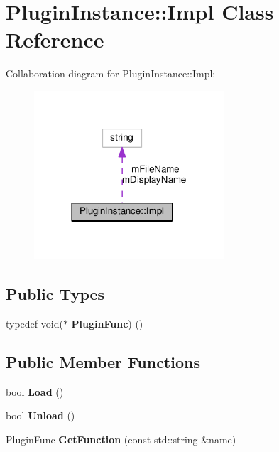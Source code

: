 \hypertarget{class_plugin_instance_1_1_impl}{}\section{Plugin\+Instance\+:\+:Impl Class Reference}
\label{class_plugin_instance_1_1_impl}


Collaboration diagram for Plugin\+Instance\+:\+:Impl\+:\nopagebreak
\begin{figure}[H]
\begin{center}
\leavevmode
\includegraphics[width=201pt]{class_plugin_instance_1_1_impl__coll__graph}
\end{center}
\end{figure}
\subsection*{Public Types}
\begin{DoxyCompactItemize}
\item 
\mbox{\label{class_plugin_instance_1_1_impl_a03b4108cd0fcdd2fb9b3309b1287b19d}} 
typedef void($\ast$ {\bfseries Plugin\+Func}) ()
\end{DoxyCompactItemize}
\subsection*{Public Member Functions}
\begin{DoxyCompactItemize}
\item 
\mbox{\label{class_plugin_instance_1_1_impl_a26ed51baaf9ab8c93406fa904680f964}} 
bool {\bfseries Load} ()
\item 
\mbox{\label{class_plugin_instance_1_1_impl_a0d52897125a93cc6ebf60d3f92f60434}} 
bool {\bfseries Unload} ()
\item 
\mbox{\label{class_plugin_instance_1_1_impl_a9266ef053cc13f8115ec56e900bf6742}} 
Plugin\+Func {\bfseries Get\+Function} (const std\+::string \&name)
\end{DoxyCompactItemize}
